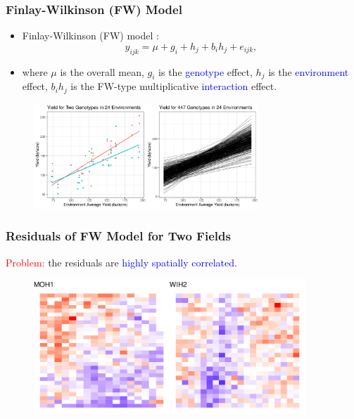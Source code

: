 \documentclass{beamer}
\begin{document}
\begin{frame}
	\frametitle{Finlay-Wilkinson (FW) Model}
	\begin{itemize}
	\item Finlay-Wilkinson (FW) model \citep{finlay1963analysis}: 
	$$y_{ijk} = \mu + g_i + h_j + b_i h_j + e_{ijk},$$
 \item where $\mu$ is the overall mean, $g_i$ is the \textcolor{blue}{genotype} effect, $h_j$ is the \textcolor{blue}{environment} effect, $ b_i h_j$ is the FW-type multiplicative \textcolor{blue}{interaction} effect.
	\end{itemize}		
		\begin{figure}[H]
		\centering
		\includegraphics[width = 0.75\textwidth]{fw_plot_paper.pdf}
	\end{figure}
\end{frame}






\begin{frame}
	\frametitle{Residuals of FW Model for Two Fields}
	\textcolor{red}{Problem:} the residuals are \textcolor{blue}{highly spatially correlated}.
	\begin{figure}[H]
		\centering
		\includegraphics[width = 0.91\textwidth]{resid_plot_2.pdf}
	\end{figure}
\end{frame}
\end{document}

